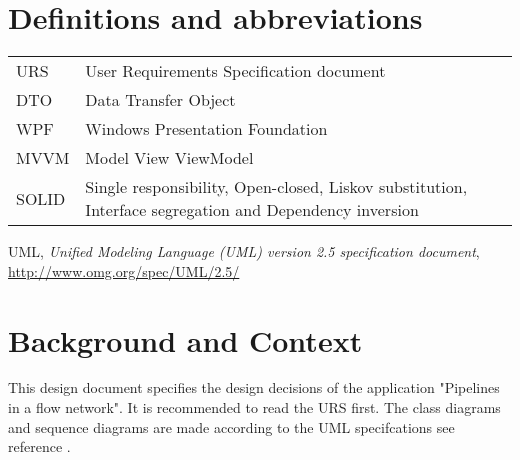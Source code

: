 \documentclass[12pt]{report}
\begin{document}

\restoregeometry 
\nopagecolor

\begingroup
\let\cleardoublepage\relax
\let\clearpage\relax

\section*{Definitions and abbreviations}
\begin{longtable}[l]{p{50pt} p{350pt}} 
URS & User Requirements Specification document\\ 
DTO & Data Transfer Object\\ 
WPF & Windows Presentation Foundation\\ 
MVVM & Model View ViewModel\\ 
SOLID & Single responsibility, Open-closed, Liskov substitution, Interface segregation and Dependency inversion\\
\end{longtable}

\begin{thebibliography}{9}
	
	UML,
	\emph{Unified Modeling Language (UML) version 2.5 specification document}, \url{http://www.omg.org/spec/UML/2.5/}
	
\end{thebibliography}

\section*{Background and Context}
This design document specifies the design decisions of the application "Pipelines in a flow network". It is recommended to read the URS first. The class diagrams and sequence diagrams are made according to the UML specifcations see reference \cite{bib:uml}.

\newpage
\tableofcontents
\endgroup




\end{document}
